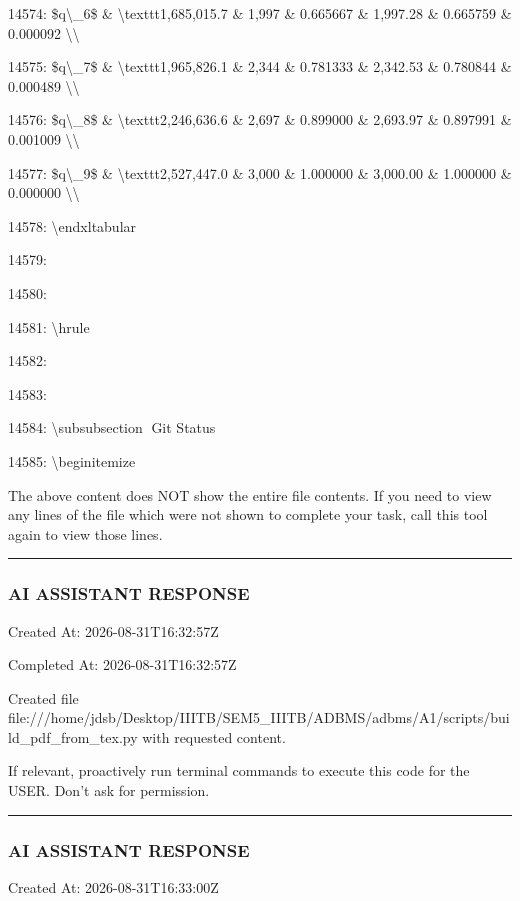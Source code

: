 \documentclass[11pt,a4paper]{article}
\begin{document}
14574: \$q\textbackslash{}\_6\$ \& \textbackslash{}texttt{1,685,015.7} \& 1,997 \& 0.665667 \& 1,997.28 \& 0.665759 \& 0.000092 \textbackslash{}\textbackslash{}

14575: \$q\textbackslash{}\_7\$ \& \textbackslash{}texttt{1,965,826.1} \& 2,344 \& 0.781333 \& 2,342.53 \& 0.780844 \& 0.000489 \textbackslash{}\textbackslash{}

14576: \$q\textbackslash{}\_8\$ \& \textbackslash{}texttt{2,246,636.6} \& 2,697 \& 0.899000 \& 2,693.97 \& 0.897991 \& 0.001009 \textbackslash{}\textbackslash{}

14577: \$q\textbackslash{}\_9\$ \& \textbackslash{}texttt{2,527,447.0} \& 3,000 \& 1.000000 \& 3,000.00 \& 1.000000 \& 0.000000 \textbackslash{}\textbackslash{}

14578: \textbackslash{}end{xltabular}

14579:

14580:

14581: \textbackslash{}hrule

14582:

14583:

14584: \textbackslash{}subsubsection{🐙 Git Status}

14585: \textbackslash{}begin{itemize}

The above content does NOT show the entire file contents. If you need to view any lines of the file which were not shown to complete your task, call this tool again to view those lines.


\hrule

\subsubsection{AI ASSISTANT RESPONSE}

Created At: 2026-08-31T16:32:57Z

Completed At: 2026-08-31T16:32:57Z

Created file file:///home/jdsb/Desktop/IIITB/SEM5\_IIITB/ADBMS/adbms/A1/scripts/build\_pdf\_from\_tex.py with requested content.

If relevant, proactively run terminal commands to execute this code for the USER. Don't ask for permission.


\hrule

\subsubsection{AI ASSISTANT RESPONSE}

Created At: 2026-08-31T16:33:00Z
\end{document}
